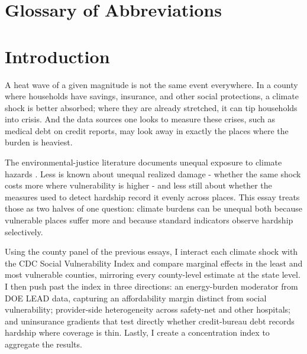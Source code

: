 \documentclass[a4paper,11pt]{article}
\begin{document}
\section*{Glossary of Abbreviations}

\clearpage
\FloatBarrier
\section{Introduction}

A heat wave of a given magnitude is not the same event everywhere. In a county where households have savings, insurance, and other social protections, a climate shock is better absorbed; where they are already stretched, it can tip households into crisis. And the data sources one looks to measure these crises, such as medical debt on credit reports, may look away in exactly the places where the burden is heaviest.

The environmental-justice literature documents unequal exposure to climate hazards \citep[see][]{banzhaf2019ej}. Less is known about unequal realized damage - whether the same shock costs more where vulnerability is higher - and less still about whether the measures used to detect hardship record it evenly across places. This essay treats those as two halves of one question: climate burdens can be unequal both because vulnerable places suffer more and because standard indicators observe hardship selectively.

Using the county panel of the previous essays, I interact each climate shock with the CDC Social Vulnerability Index and compare marginal effects in the least and most vulnerable counties, mirroring every county-level estimate at the state level. I then push past the index in three directions: an energy-burden moderator from DOE LEAD data, capturing an affordability margin distinct from social vulnerability; provider-side heterogeneity across safety-net and other hospitals; and uninsurance gradients that test directly whether credit-bureau debt records hardship where coverage is thin. Lastly, I create a concentration index to aggregate the results.
\end{document}
